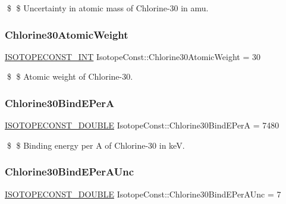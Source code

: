\$ \$ Uncertainty in atomic mass of Chlorine-\/30 in amu. \mbox{\label{group___isotope_const-_chlorine-_cl30_gab33a9568a734b9dbb2913042b36d6ab6}} 
\subsubsection{\texorpdfstring{Chlorine30\+Atomic\+Weight}{Chlorine30AtomicWeight}}
{\footnotesize\ttfamily \mbox{\hyperlink{group___isotope_const-_macros_ga5f18360b3e99483a35c32d789e62621c}{I\+S\+O\+T\+O\+P\+E\+C\+O\+N\+S\+T\+\_\+\+I\+NT}} Isotope\+Const\+::\+Chlorine30\+Atomic\+Weight = 30}

\$ \$ Atomic weight of Chlorine-\/30. \mbox{\label{group___isotope_const-_chlorine-_cl30_gacd2b579b785c6ad201a7f705498f28f0}} 
\subsubsection{\texorpdfstring{Chlorine30\+Bind\+E\+PerA}{Chlorine30BindEPerA}}
{\footnotesize\ttfamily \mbox{\hyperlink{group___isotope_const-_macros_ga8f45a7272ce02c0b4c65c44636ed719a}{I\+S\+O\+T\+O\+P\+E\+C\+O\+N\+S\+T\+\_\+\+D\+O\+U\+B\+LE}} Isotope\+Const\+::\+Chlorine30\+Bind\+E\+PerA = 7480}

\$ \$ Binding energy per A of Chlorine-\/30 in keV. \mbox{\label{group___isotope_const-_chlorine-_cl30_ga692eccd52acbb9c40dcad19ce18f2648}} 
\subsubsection{\texorpdfstring{Chlorine30\+Bind\+E\+Per\+A\+Unc}{Chlorine30BindEPerAUnc}}
{\footnotesize\ttfamily \mbox{\hyperlink{group___isotope_const-_macros_ga8f45a7272ce02c0b4c65c44636ed719a}{I\+S\+O\+T\+O\+P\+E\+C\+O\+N\+S\+T\+\_\+\+D\+O\+U\+B\+LE}} Isotope\+Const\+::\+Chlorine30\+Bind\+E\+Per\+A\+Unc = 7}

